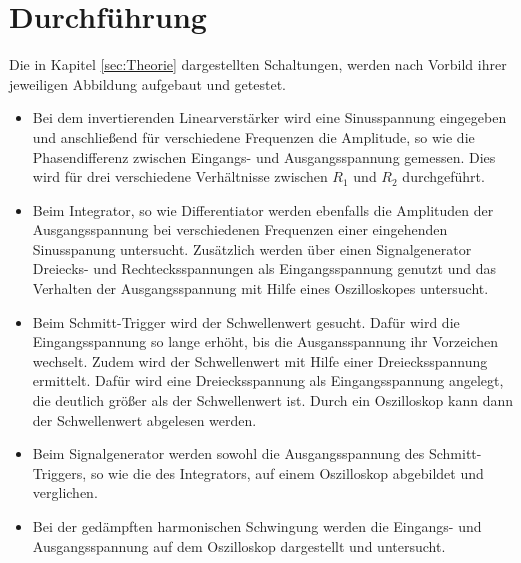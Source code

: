 
\section{Durchführung}
\label{sec:Durchführung}
Die in Kapitel \ref{sec:Theorie} dargestellten Schaltungen, werden nach Vorbild ihrer jeweiligen Abbildung aufgebaut und getestet.

\begin{itemize}
    \item Bei dem invertierenden Linearverstärker wird eine Sinusspannung eingegeben und anschließend für verschiedene Frequenzen die Amplitude, so wie die Phasendifferenz zwischen Eingangs- und Ausgangsspannung gemessen.
        Dies wird für drei verschiedene Verhältnisse zwischen $R_1$ und $R_2$ durchgeführt.

    \item Beim Integrator, so wie Differentiator werden ebenfalls die Amplituden der Ausgangsspannung bei verschiedenen Frequenzen einer eingehenden Sinusspanung untersucht.
        Zusätzlich werden über einen Signalgenerator Dreiecks- und Rechtecksspannungen als Eingangsspannung genutzt und das Verhalten der Ausgangsspannung mit Hilfe eines Oszilloskopes untersucht.

    \item Beim Schmitt-Trigger wird der Schwellenwert gesucht. Dafür wird die Eingangsspannung so lange erhöht, bis die Ausgansspannung ihr Vorzeichen wechselt.
        Zudem wird der Schwellenwert mit Hilfe einer Dreiecksspannung ermittelt. Dafür wird eine Dreiecksspannung als Eingangsspannung angelegt, die deutlich größer als der Schwellenwert ist.
    	Durch ein Oszilloskop kann dann der Schwellenwert abgelesen werden.

    \item Beim Signalgenerator werden sowohl die Ausgangsspannung des Schmitt-Triggers, so wie die des Integrators, auf einem Oszilloskop abgebildet und verglichen.

    \item Bei der gedämpften harmonischen Schwingung werden die Eingangs- und Ausgangsspannung auf dem Oszilloskop dargestellt und untersucht.

\end{itemize}

